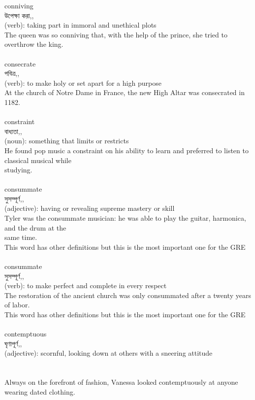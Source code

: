\documentclass{article}
\begin{document}
{conniving}\\
{উপেক্ষা করা,,}\\
{(verb): taking part in immoral and unethical plots\\The queen was so conniving that, with the help of the prince, she tried to overthrow the king.\\}\\
{consecrate}\\
{পবিত্র,,}\\
{(verb): to make holy or set apart for a high purpose\\At the church of Notre Dame in France, the new High Altar was consecrated in 1182.\\}\\
{constraint}\\
{বাধ্যতা,,}\\
{(noun): something that limits or restricts\\He found pop music a constraint on his ability to learn and preferred to listen to classical musical while\\studying.\\}\\
{consummate}\\
{সুসম্পূর্ণ,,}\\
{(adjective): having or revealing supreme mastery or skill\\Tyler was the consummate musician: he was able to play the guitar, harmonica, and the drum at the\\same time.\\This word has other definitions but this is the most important one for the GRE\\}\\
{consummate}\\
{সুসম্পূর্ণ,,}\\
{(verb): to make perfect and complete in every respect\\The restoration of the ancient church was only consummated after a twenty years of labor.\\This word has other definitions but this is the most important one for the GRE\\}\\
{contemptuous}\\
{ঘৃণাপূর্ণ,,}\\
{(adjective): scornful, looking down at others with a sneering attitude\\\\                                                                                 \\Always on the forefront of fashion, Vanessa looked contemptuously at anyone wearing dated clothing.\\}\\
\end{document}

